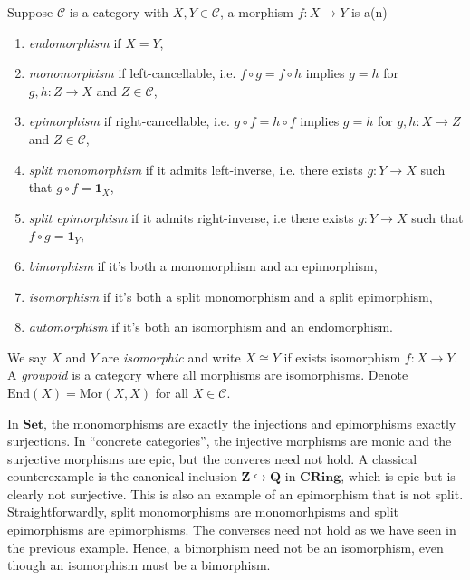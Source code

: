 \documentclass[11pt]{book}
\begin{document}
\begin{definition}Suppose $\mathcal C$ is a category with $X,Y\in\mathcal C$, a morphism $f:X\rightarrow Y$ is a(n)
\begin{enumerate}[label=(\roman*)]
	\item \textit{endomorphism} if $X=Y$,
	\item \textit{monomorphism} if left-cancellable, i.e. $f\circ g=f\circ h$ implies $g=h$ for $g,h:Z\rightarrow X$ and $Z\in\mathcal C$,
	\item \textit{epimorphism} if right-cancellable, i.e. $g\circ f=h\circ f$ implies $g=h$ for $g,h:X\rightarrow Z$ and $Z\in\mathcal C$,
	\item \textit{split monomorphism} if it admits left-inverse, i.e. there exists $g:Y\rightarrow X$ such that $g\circ f=\mathbf 1_X$,
	\item \textit{split epimorphism} if it admits right-inverse, i.e there exists $g:Y\rightarrow X$ such that $f\circ g=\mathbf 1_Y$,
	\item \textit{bimorphism} if it's both a monomorphism and an epimorphism,
	\item \textit{isomorphism} if it's both a split monomorphism and a split epimorphism,
	\item \textit{automorphism} if it's both an isomorphism and an endomorphism. 
\end{enumerate}
We say $X$ and $Y$ are \textit{isomorphic} and write $X\cong Y$ if exists isomorphism $f:X\rightarrow Y$. A \textit{groupoid} is a category where all morphisms are isomorphisms. Denote $\mathrm{End}(X)=\mathrm{Mor}(X,X)$ for all $X\in\mathcal C$.
\end{definition}
In $\mathbf{Set}$, the monomorphisms are exactly the injections and epimorphisms exactly surjections. In ``concrete categories'', the injective morphisms are monic and the surjective morphisms are epic, but the converes need not hold. A classical counterexample is the canonical inclusion $\mathbf Z\hookrightarrow\mathbf Q$ in $\mathbf{CRing}$, which is epic but is clearly not surjective. This is also an example of an epimorphism that is not split. Straightforwardly, split monomorphisms are monomorhpisms and split epimorphisms are epimorphisms. The converses need not hold as we have seen in the previous example. Hence, a bimorphism need not be an isomorphism, even though an isomorphism must be a bimorphism. 
\end{document}
